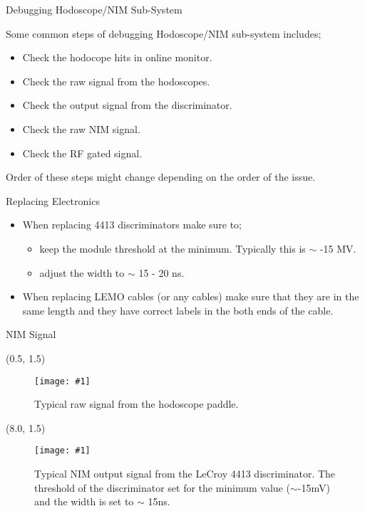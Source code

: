 \documentclass[10pt, xcolor={dvipsnames}, aspectratio = 169, sans,mathserif]{beamer}
\newcommand{\leftpic}[2]
{
\begin{textblock}{7.0}(0.5, 1.5)
\begin{figure}
    \centering
    \texttt{[image: \#1]}
    \caption{#2}
\end{figure}
\end{textblock}
}
\newcommand{\rightpic}[2]
{
\begin{textblock}{7.0}(8.0, 1.5)
\begin{figure}
    \centering
    \texttt{[image: \#1]}
    \caption{#2}
\end{figure}
\end{textblock}
}
\begin{document}
\begin{frame}{Debugging Hodoscope/NIM Sub-System}

Some common steps of debugging Hodoscope/NIM sub-system includes;

\begin{itemize}

    \item Check the hodocope hits in online monitor.

    \item Check the raw signal from the hodoscopes.

    \item Check the output signal from the discriminator.

    \item Check the raw NIM signal.

    \item Check the RF gated signal.

\end{itemize}

Order of these steps might change depending on the order of the issue.

\end{frame}

\begin{frame}{Replacing Electronics}

\begin{itemize}

    \item When replacing 4413 discriminators make sure to;

    \begin{itemize}

        \item keep the module threshold at the minimum. Typically this is $\sim$ -15 MV.

        \item adjust the width to $\sim$ 15 - 20 ns. 

    \end{itemize}

    \item When replacing LEMO cables (or any cables) make sure that they are in the same length and they have correct labels in the both ends of the cable.

\end{itemize}

\end{frame}


\begin{frame}{NIM Signal}

\leftpic{signal_1.jpg}{Typical raw signal from the hodoscope paddle.}

\rightpic{signal_2.jpg}{Typical NIM output signal from the LeCroy 4413 discriminator. The threshold of the discriminator set for the minimum value ($\sim$-15mV) and the width is set to $\sim$ 15ns.}

\end{frame}
\end{document}
